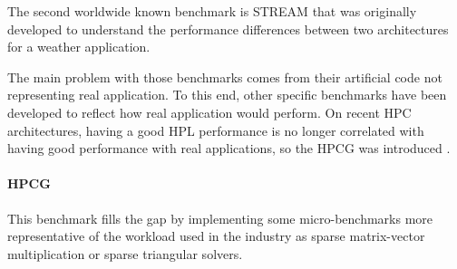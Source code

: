 The second worldwide known benchmark is STREAM \cite{HPC:stream} that was originally developed to understand the performance differences between two architectures for a weather application.

The main problem with those benchmarks comes from their artificial code not representing real application. To this end, other specific benchmarks have been developed to reflect how real application would perform. On recent HPC architectures, having a good HPL performance is no longer correlated with having good performance with real applications, so the HPCG was introduced \cite{HPC:hpcg}. 

\paragraph{HPCG} This benchmark fills the gap by implementing some micro-benchmarks more representative of the workload used in the industry as sparse matrix-vector multiplication or sparse triangular solvers.